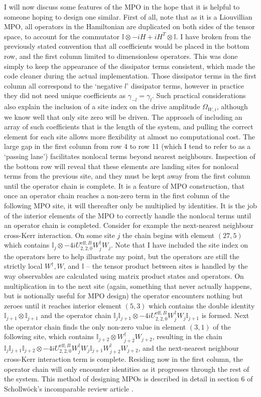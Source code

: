 I will now discuss some features of the MPO in the hope that it is helpful to someone hoping to design one similar. First of all, note that as it is a Liouvillian MPO, all operators in the Hamiltonian are duplicated on both sides of the tensor space, to account for the commutator \(\mathbb{I} \otimes -iH + iH^{T} \otimes \mathbb{I}\). I have broken from the previously stated convention that all coefficients would be placed in the bottom row, and the first column limited to dimensionless operators. This was done simply to keep the appearance of the dissipator terms consistent, which made the code cleaner during the actual implementation. Those dissipator terms in the first column all correspond to the `negative \(l\)' dissipator terms, however in practice they did not need unique coefficients as \(\gamma_{-l} = \gamma_{l}\). Such practical considerations also explain the inclusion of a site index on the drive amplitude \(\Omega_{W,i}\), although we know well that only site zero will be driven. The approach of including an array of such coefficients that is the length of the system, and pulling the correct element for each site allows more flexibility at almost no computational cost. The large gap in the first column from row 4 to row 11 (which I tend to refer to as a `passing lane') facilitates nonlocal terms beyond nearest neighbours. Inspection of the bottom row will reveal that these elements are landing sites for nonlocal terms from the previous site, and they must be kept away from the first column until the operator chain is complete. It is a feature of MPO construction, that once an operator chain reaches a non-zero term in the first column of the following MPO site, it will thereafter only be multiplied by identities. It is the job of the interior elements of the MPO to correctly handle the nonlocal terms until an operator chain is completed. Consider for example the next-nearest neighbour cross-Kerr interaction. On some site \(j\) the chain begins with element \((27,5)\) which contains \(\mathbb{I}_{j} \otimes -4iU^{\mathrm{eff},B}_{2,2,0}W_{j}^{\dagger}W_{j}\). Note that I have included the site index on the operators here to help illustrate my point, but the operators are still the strictly local \(W^{\dagger}, W\), and \(\mathbb{I}\) -- the tensor product between sites is handled by the way observables are calculated using matrix product states and operators. On multiplication in to the next site (again, something that never actually happens, but is notionally useful for MPO design) the operator encounters nothing but zeroes until it reaches interior element \((5,3)\) which contains the double identity \(\mathbb{I}_{j+1} \otimes \mathbb{I}_{j+1}\) and the operator chain \(\mathbb{I}_{j}\mathbb{I}_{j+1} \otimes -4iU^{\mathrm{eff},B}_{2,2,0}W_{j}^{\dagger}W_{j}\mathbb{I}_{j+1}\) is formed. Next the operator chain finds the only non-zero value in element \((3,1)\) of the following site, which contains \(\mathbb{I}_{j+2} \otimes W_{j+2}^{\dagger}W_{j+2}\), resulting in the chain \(\mathbb{I}_{j}\mathbb{I}_{j+1}\mathbb{I}_{j+2} \otimes -4iU^{\mathrm{eff},B}_{2,2,0}W_{j}^{\dagger}W_{j}\mathbb{I}_{j+1}W_{j+2}^{\dagger}W_{j+2}\), and the next-nearest neighbour cross-Kerr interaction term is complete. Residing now in the first column, the operator chain will only encounter identities as it progresses through the rest of the system. This method of designing MPOs is described in detail in section 6 of Schollw\"{o}ck's incomparable review article \cite{Schollwock2011}.